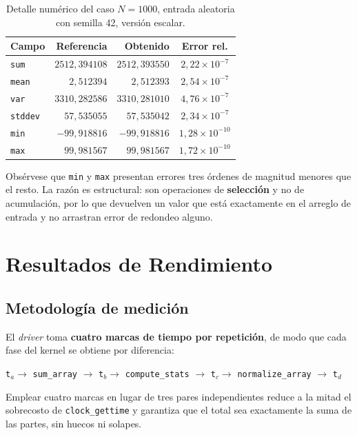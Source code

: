 \documentclass[journal]{IEEEtran}
\begin{document}
\begin{table}[ht]
\centering
\caption{Detalle numérico del caso $N = 1000$, entrada aleatoria con
  semilla 42, versión escalar.}
\label{tab:detalle1000}
\footnotesize
\setlength{\tabcolsep}{3pt}
\begin{tabular}{|l|r|r|c|}
\hline
\textbf{Campo} & \textbf{Referencia} & \textbf{Obtenido} & \textbf{Error rel.} \\ \hline
\texttt{sum}    & $2512,394108$ & $2512,393550$ & $2,22\times10^{-7}$ \\ \hline
\texttt{mean}   & $2,512394$    & $2,512393$    & $2,54\times10^{-7}$ \\ \hline
\texttt{var}    & $3310,282586$ & $3310,281010$ & $4,76\times10^{-7}$ \\ \hline
\texttt{stddev} & $57,535055$   & $57,535042$   & $2,34\times10^{-7}$ \\ \hline
\texttt{min}    & $-99,918816$  & $-99,918816$  & $1,28\times10^{-10}$ \\ \hline
\texttt{max}    & $99,981567$   & $99,981567$   & $1,72\times10^{-10}$ \\ \hline
\end{tabular}
\end{table}

Obsérvese que \texttt{min} y \texttt{max} presentan errores tres órdenes
de magnitud menores que el resto. La razón es estructural: son
operaciones de \textbf{selección} y no de acumulación, por lo que
devuelven un valor que está exactamente en el arreglo de entrada y no
arrastran error de redondeo alguno.

\section{Resultados de Rendimiento}
\label{sec:rendimiento}

\subsection{Metodología de medición}

El \textit{driver} toma \textbf{cuatro marcas de tiempo por repetición},
de modo que cada fase del kernel se obtiene por diferencia:
\begin{center}
\texttt{t}$_a \to$ \texttt{sum\_array} $\to$ \texttt{t}$_b \to$
\texttt{compute\_stats} $\to$ \texttt{t}$_c \to$
\texttt{normalize\_array} $\to$ \texttt{t}$_d$
\end{center}
Emplear cuatro marcas en lugar de tres pares independientes reduce a la
mitad el sobrecosto de \texttt{clock\_gettime} y garantiza que el total sea
exactamente la suma de las partes, sin huecos ni solapes.
\end{document}
